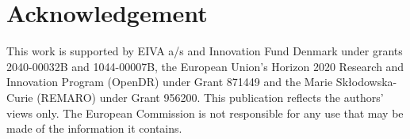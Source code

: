 \documentclass[letterpaper, 10 pt, conference]{ieeeconf}  %
\begin{document}


\section*{Acknowledgement}
This work is supported by EIVA a/s and Innovation Fund Denmark under grants 2040-00032B and 1044-00007B, the European Union’s Horizon 2020 Research and Innovation Program (OpenDR) under Grant 871449 and the Marie Skłodowska-Curie (REMARO) under Grant 956200. This publication reflects the authors’ views only. The European Commission is not responsible for any use that may be made of the information it contains.








\end{document}
